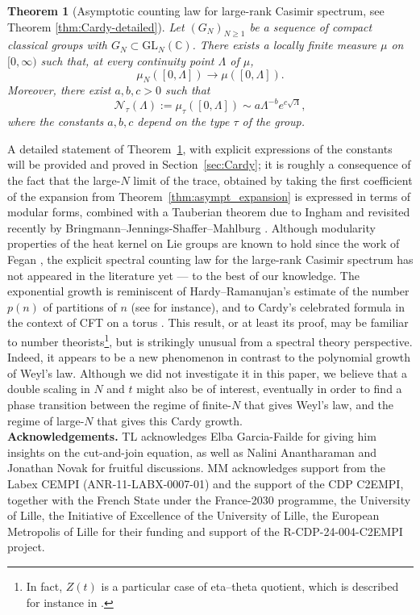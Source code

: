 \documentclass[11pt,a4paper,reqno]{article}
\newtheorem{theorem}{Theorem}[section]
\theoremstyle{definition}
\theoremstyle{remark}
\newcommand\GL{{\mathrm{GL}}}
\newcommand\C{\mathbb{C}}
\begin{document}
\begin{theorem}[Asymptotic counting law for large-rank Casimir spectrum, see Theorem \ref{thm:Cardy-detailed}]\label{thm:Cardy}
Let $(G_N)_{N\geq1}$ be a sequence of compact classical groups  with $G_N\subset\GL_N(\C)$. There exists a locally finite measure $\mu$ on $[0,\infty)$ such that, at every
continuity point $\Lambda$ of $\mu$,
\begin{equation}\label{eq:cv_continuitypoint}
\mu_N([0,\Lambda])\longrightarrow \mu([0,\Lambda]).
\end{equation}
Moreover, there exist $a,b,c >0$ such that
\[ \mathcal{N}_\tau(\Lambda):=\mu_\tau([0,\Lambda]) \sim a \Lambda^{-b} e^{c\sqrt \Lambda},\]
where the constants $a,b,c$ depend on the type $\tau$ of the group.
\end{theorem}

A detailed statement of  Theorem~\ref{thm:Cardy}, with explicit expressions of the constants  will be provided and proved in Section~\ref{sec:Cardy}; it is roughly a consequence of the fact that the large-$N$ limit of the trace, obtained by taking the first coefficient of the expansion from Theorem~\ref{thm:asympt_expansion} is expressed in terms of modular forms, combined with a Tauberian theorem due to Ingham \cite{Ing41} and revisited recently by Bringmann--Jennings-Shaffer--Mahlburg \cite{BJSM23}. Although modularity properties of the heat kernel on Lie groups are known to hold since the work of Fegan \cite{Feg},  the explicit spectral counting law for the large-rank Casimir spectrum has not appeared in the literature yet --- to the best of our knowledge. The exponential growth is reminiscent of Hardy--Ramanujan's estimate of the number $p(n)$ of partitions of $n$ (see \cite{Apo} for instance), and to Cardy's celebrated formula in the context of CFT on a torus \cite{Car86}. This result, or at least its proof, may be familiar to number theorists\footnote{In fact, $Z(t)$ is a particular case of eta--theta quotient, which is described for instance in \cite{FGKST16}.}, but is strikingly unusual from a spectral theory perspective. Indeed, it appears to be a new phenomenon in contrast to the polynomial growth of Weyl's law. Although we did not investigate it in this paper, we believe that a double scaling in $N$ and $t$ might also be of interest, eventually in order to find a phase transition between the regime of finite-$N$ that gives Weyl's law, and the regime of large-$N$ that gives this Cardy growth.\\


{\bf Acknowledgements.} TL acknowledges Elba Garcia-Failde for giving him insights on the cut-and-join equation, as well as Nalini Anantharaman and Jonathan Novak for fruitful discussions. MM  acknowledges support from the Labex CEMPI (ANR-11-LABX-0007-01) and the support of the CDP C2EMPI, together with the French State under the France-2030 programme, the University of Lille, the Initiative of Excellence of the University of Lille, the European Metropolis of Lille for their funding and support of the R-CDP-24-004-C2EMPI project. 
\end{document}
